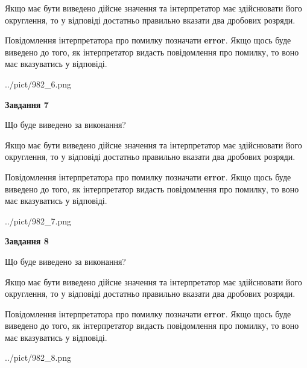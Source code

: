 \documentclass[12pt, ukrainian]{article}
\begin{document}
{\begin {Large}
Якщо має бути виведено дійсне значення та інтерпретатор має здійснювати його округлення, 
то у відповіді достатньо правильно вказати два дробових розряди.

Повідомлення інтерпретатора про помилку позначати \textbf{error}.
Якщо щось буде виведено до того, як інтерпретатор видасть повідомлення про помилку, 
то воно має вказуватись у відповіді. \par

\begin{center}
	{../pict/982_6.png}
\end{center}
\newpage

{\begin {center}\textbf{Завдання 7}\end {center}}\par
Що буде виведено за виконання? \par

Якщо має бути виведено дійсне значення та інтерпретатор має здійснювати його округлення, 
то у відповіді достатньо правильно вказати два дробових розряди.

Повідомлення інтерпретатора про помилку позначати \textbf{error}.
Якщо щось буде виведено до того, як інтерпретатор видасть повідомлення про помилку, 
то воно має вказуватись у відповіді. \par

\begin{center}
	{../pict/982_7.png}
\end{center}
\newpage

{\begin {center}\textbf{Завдання 8}\end {center}}\par
Що буде виведено за виконання? \par

Якщо має бути виведено дійсне значення та інтерпретатор має здійснювати його округлення, 
то у відповіді достатньо правильно вказати два дробових розряди.

Повідомлення інтерпретатора про помилку позначати \textbf{error}.
Якщо щось буде виведено до того, як інтерпретатор видасть повідомлення про помилку, 
то воно має вказуватись у відповіді. \par

\begin{center}
	{../pict/982_8.png}
\end{center}
\newpage


\end{Large}}
\end{document}
